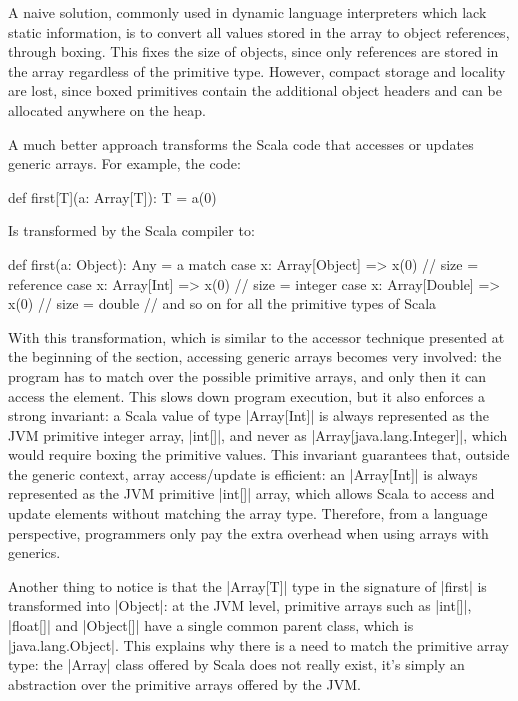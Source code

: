A naive solution, commonly used in dynamic language interpreters which lack static information, is to convert all values stored in the array to object references, through boxing. This fixes the size of objects, since only references are stored in the array regardless of the primitive type. However, compact storage and locality are lost, since boxed primitives contain the additional object headers and can be allocated anywhere on the heap.

A much better approach transforms the Scala code that accesses or updates generic arrays. For example, the code:

\begin{lstlisting-nobreak}
 def first[T](a: Array[T]): T = a(0)
\end{lstlisting-nobreak}

Is transformed by the Scala compiler to:

\begin{lstlisting-nobreak}
 def first(a: Object): Any =
   a match {
     case x: Array[Object] => x(0) // size = reference
     case x: Array[Int]    => x(0)           // size = integer
     case x: Array[Double] => x(0) // size = double
     // and so on for all the primitive types of Scala
   }
\end{lstlisting-nobreak}


With this transformation, which is similar to the accessor technique presented at the beginning of the section, accessing generic arrays becomes very involved: the program has to match over the possible primitive arrays, and only then it can access the element. This slows down program execution, but it also enforces a strong invariant: a Scala value of type |Array[Int]| is always represented as the JVM primitive integer array, |int[]|, and never as |Array[java.lang.Integer]|, which would require boxing the primitive values. This invariant guarantees that, outside the generic context, array access/update is efficient: an |Array[Int]| is always represented as the JVM primitive |int[]| array, which allows Scala to access and update elements without matching the array type. Therefore, from a language perspective, programmers only pay the extra overhead when using arrays with generics.

Another thing to notice is that the |Array[T]| type in the signature of |first| is transformed into |Object|: at the JVM level, primitive arrays such as |int[]|, |float[]| and |Object[]| have a single common parent class, which is |java.lang.Object|. This explains why there is a need to match the primitive array type: the |Array| class offered by Scala does not really exist, it's simply an abstraction over the primitive arrays offered by the JVM.


